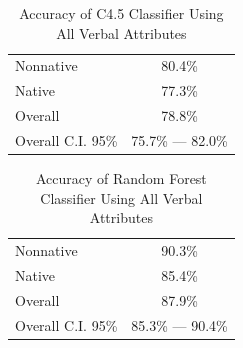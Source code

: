 \documentclass[main.tex]{subfiles}
\begin{document}
\begin{table}[htbp]
\centering
\caption{Accuracy of C4.5 Classifier Using All Verbal Attributes}
\begin{tabular}{l c}
\toprule
Nonnative & 80.4\% \\
Native & 77.3\% \\
Overall & 78.8\% \\
Overall C.I. 95\% & 75.7\% --- 82.0\%\\
\bottomrule
\end{tabular}
\label{table:c45-combined-results}
\end{table}

\begin{table}[htbp]
\centering
\caption{Accuracy of Random Forest Classifier Using All Verbal Attributes}
\begin{tabular}{l c}
\toprule
Nonnative & 90.3\% \\
Native & 85.4\% \\
Overall & 87.9\% \\
Overall C.I. 95\% & 85.3\% --- 90.4\%\\
\bottomrule
\end{tabular}
\label{table:combined-results}
\end{table}

\newpage
\biblio
\end{document}
